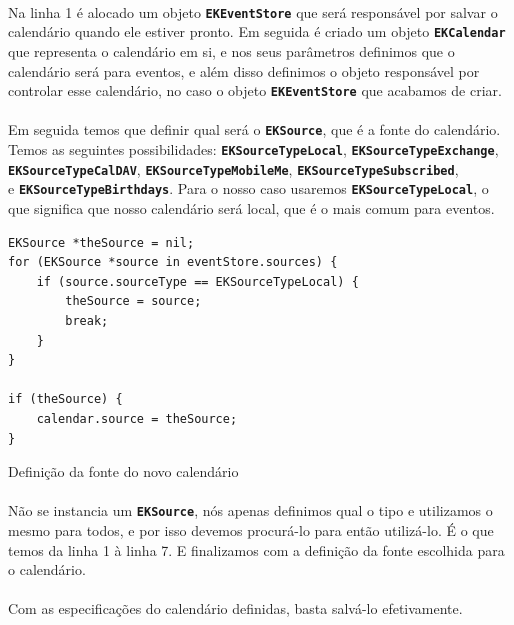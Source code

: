 \documentclass[a4paper,12pt,brazil,doubleside]{book}
\begin{document}
\begin{singlespace}
\paragraph{}Na linha 1 é alocado um objeto \texttt{\textbf{EKEventStore}} que será responsável por salvar o calendário quando ele estiver pronto. Em seguida é criado um objeto \texttt{\textbf{EKCalendar}} que representa o calendário em si, e nos seus parâmetros definimos que o calendário será para eventos, e além disso definimos o objeto responsável por controlar esse calendário, no caso o objeto \texttt{\textbf{EKEventStore}} que acabamos de criar.
\paragraph{}Em seguida temos que definir qual será o \texttt{\textbf{EKSource}}, que é a fonte do calendário. Temos as seguintes possibilidades: \texttt{\textbf{EKSourceTypeLocal}}, \texttt{\textbf{EKSourceTypeExchange}},\\ \texttt{\textbf{EKSourceTypeCalDAV}}, \texttt{\textbf{EKSourceTypeMobileMe}}, \texttt{\textbf{EKSourceTypeSubscribed}},\\ e \texttt{\textbf{EKSourceTypeBirthdays}}. Para o nosso caso usaremos \texttt{\textbf{EKSourceTypeLocal}}, o que significa que nosso calendário será local, que é o mais comum para eventos.

\begin{listing}[H]
\begin{verbatim}
EKSource *theSource = nil;
for (EKSource *source in eventStore.sources) {
    if (source.sourceType == EKSourceTypeLocal) {
        theSource = source;
        break;
    }
}
    
if (theSource) {
    calendar.source = theSource;
}
\end{verbatim}
\caption{Definição da fonte do novo calendário}
\end{listing}

\paragraph{}Não se instancia um \texttt{\textbf{EKSource}}, nós apenas definimos qual o tipo e utilizamos o mesmo para todos, e por isso devemos procurá-lo para então utilizá-lo. É o que temos da linha 1 à linha 7. E finalizamos com a definição da fonte escolhida para o calendário.
\paragraph{}Com as especificações do calendário definidas, basta salvá-lo efetivamente.


\end{singlespace}
\end{document}
